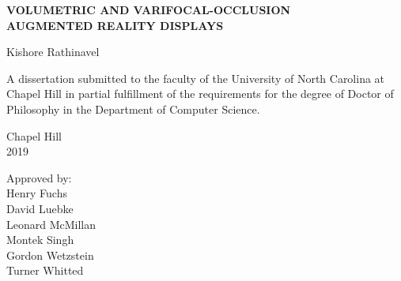 \begin{titlepage}
\begin{center}


\vspace{2in}
\begin{singlespace}
\Large \bf
VOLUMETRIC AND VARIFOCAL-OCCLUSION\\ AUGMENTED REALITY DISPLAYS 
\end{singlespace}


\vspace{61pt} %
\large Kishore Rathinavel
\end{center}



\vspace{50pt}
\begin{singlespace}
\noindent \large
A dissertation submitted to the faculty of the University of North Carolina at Chapel Hill
in partial fulfillment of the requirements for the degree of Doctor of Philosophy in
the Department of Computer Science.
\end{singlespace}


\vspace{50pt}
\begin{center}
\begin{singlespace} \large
Chapel Hill\\
2019
\end{singlespace}
\end{center}


\vfill
\begin{flushright}
\begin{minipage}[t]{1.5in} \large
Approved by:\\
Henry Fuchs\\
David Luebke\\
Leonard McMillan\\
Montek Singh\\
Gordon Wetzstein\\
Turner Whitted
\end{minipage}
\end{flushright}

\end{titlepage}